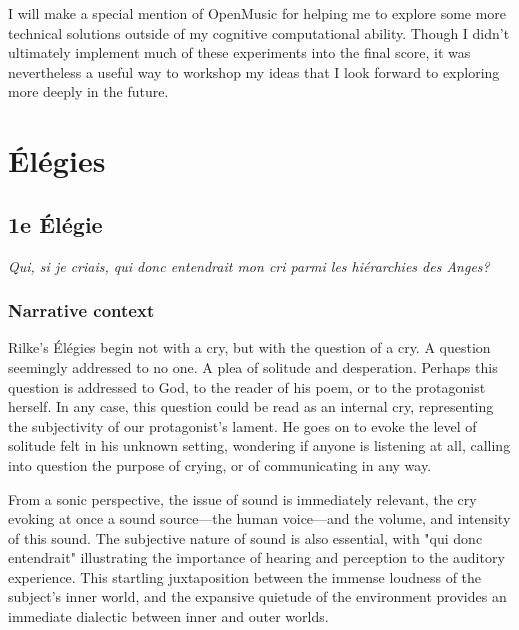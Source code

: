 \documentclass[12pt,twoside,maitrise]{dms_ks}
\theoremstyle{definition}
\begin{document}

I will make a special mention of OpenMusic for helping me to explore some more technical solutions outside of my cognitive computational ability. 
Though I didn't ultimately implement much of these experiments into the final score, it was nevertheless a useful way to workshop my ideas that I look forward to exploring more deeply in the future.

\chapter{Élégies}


\section{1e Élégie}

\epigraph{\textit{Qui, si je criais, qui donc entendrait mon cri parmi les hiérarchies des Anges?}}{}

\subsection{Narrative context}
Rilke's Élégies begin not with a cry, but with the question of a cry.
A question seemingly addressed to no one.
A plea of solitude and desperation.
Perhaps this question is addressed to God, to the reader of his poem, or to the protagonist herself.
In any case, this question could be read as an internal cry, representing the subjectivity of our protagonist's lament.
He goes on to evoke the level of solitude felt in his unknown setting, wondering if anyone is listening at all, calling into question the purpose of crying, or of communicating in any way.

From a sonic perspective, the issue of sound is immediately relevant, the cry evoking at once a sound source---the human voice---and the volume, and intensity of this sound.
The subjective nature of sound is also essential, with "qui donc entendrait" illustrating the importance of hearing and perception to the auditory experience.
This startling juxtaposition between the immense loudness of the subject's inner world, and the expansive quietude of the environment provides an immediate dialectic between inner and outer worlds.
\end{document}
